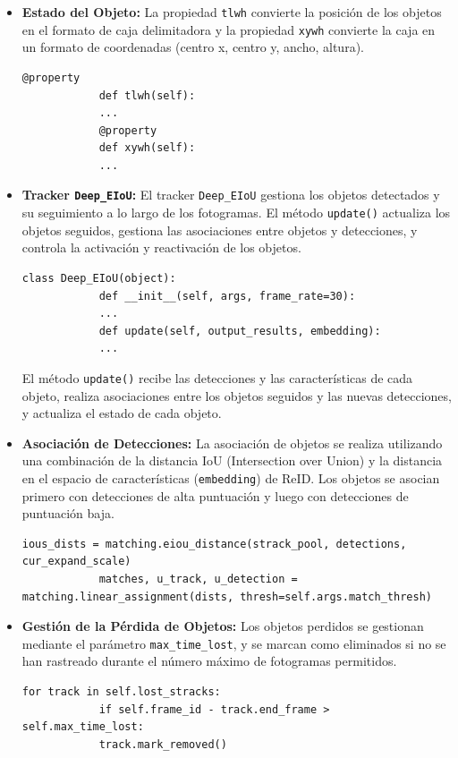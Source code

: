 \documentclass[12pt, a4paper, twoside]{article}
\begin{document}
\begin{itemize}
		\item \textbf{Estado del Objeto:}  
		La propiedad \texttt{tlwh} convierte la posición de los objetos en el formato de caja delimitadora y la propiedad \texttt{xywh} convierte la caja en un formato de coordenadas (centro x, centro y, ancho, altura).
		\begin{lstlisting}[style=pythonstyle]
			@property
			def tlwh(self):
			...
			@property
			def xywh(self):
			...
		\end{lstlisting}
		
		\item \textbf{Tracker \texttt{Deep\_EIoU}:}  
		El tracker \texttt{Deep\_EIoU} gestiona los objetos detectados y su seguimiento a lo largo de los fotogramas. El método \texttt{update()} actualiza los objetos seguidos, gestiona las asociaciones entre objetos y detecciones, y controla la activación y reactivación de los objetos.
		\begin{lstlisting}[style=pythonstyle]
			class Deep_EIoU(object):
			def __init__(self, args, frame_rate=30):
			...
			def update(self, output_results, embedding):
			...
		\end{lstlisting}
		
		El método \texttt{update()} recibe las detecciones y las características de cada objeto, realiza asociaciones entre los objetos seguidos y las nuevas detecciones, y actualiza el estado de cada objeto.
		
		\item \textbf{Asociación de Detecciones:}  
		La asociación de objetos se realiza utilizando una combinación de la distancia IoU (Intersection over Union) y la distancia en el espacio de características (\texttt{embedding}) de ReID. Los objetos se asocian primero con detecciones de alta puntuación y luego con detecciones de puntuación baja.
		\begin{lstlisting}[style=pythonstyle]
			ious_dists = matching.eiou_distance(strack_pool, detections, cur_expand_scale)
			matches, u_track, u_detection = matching.linear_assignment(dists, thresh=self.args.match_thresh)
		\end{lstlisting}
		
		\item \textbf{Gestión de la Pérdida de Objetos:}  
		Los objetos perdidos se gestionan mediante el parámetro \texttt{max\_time\_lost}, y se marcan como eliminados si no se han rastreado durante el número máximo de fotogramas permitidos.
		\begin{lstlisting}[style=pythonstyle]
			for track in self.lost_stracks:
			if self.frame_id - track.end_frame > self.max_time_lost:
			track.mark_removed()
		\end{lstlisting}
	\end{itemize}
	
\end{document}
